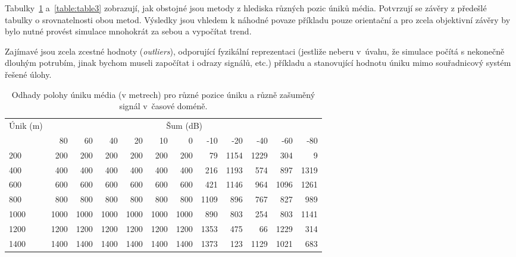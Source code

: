 Tabulky~\ref{table:table2} a~\ref{table:table3} zobrazují, jak obstojné jsou metody z hlediska různých pozic úniků média.
Potvrzují se závěry z předešlé tabulky o srovnatelnosti obou metod.
Výsledky jsou vhledem k náhodné povaze příkladu pouze orientační a pro zcela objektivní závěry by bylo nutné provést simulace mnohokrát za sebou a vypočítat trend.

Zajímavé jsou zcela zcestné hodnoty (\textit{outliers}), odporující fyzikální reprezentaci (jestliže neberu v~úvahu, že simulace počítá s nekonečně dlouhým potrubím, jinak bychom museli započítat i odrazy signálů, etc.) příkladu a stanovující hodnotu úniku mimo souřadnicový systém řešené úlohy.


\begin{table}[htb]
    \centering

    \begin{tabular}{lrrrrrrrrrrr}
        \toprule

        \multirow{2}{*}{Únik (m)}   & \multicolumn{11}{c}{Šum (dB)}                                                         \\ \cmidrule[\lightrulewidth](lr){2-12}
                                    & 80    & 60    & 40    & 20    & 10     & 0    & -10   & -20    & -40  & -60   & -80   \\ \midrule

         200                        &  200  &  200  &  200  &  200  &  200  &  200  &   79  & 1154   & 1229 &  304  &    9  \\
         400                        &  400	&  400  &  400  &  400  &  400  &  400  &  216  & 1193   &  574 &  897  & 1319  \\
         600                        &  600	&  600  &  600  &  600  &  600  &  600  &  421  & 1146   &  964 & 1096  & 1261  \\
         800                        &  800	&  800  &  800  &  800  &  800  &  800  & 1109  &  896   &  767 &  827  &  989  \\
        1000                        & 1000	& 1000  & 1000  & 1000  & 1000  & 1000  &  890  &  803   &  254 &  803  & 1141  \\
        1200                        & 1200	& 1200  & 1200  & 1200  & 1200  & 1200  & 1353  &  475   &   66 & 1229  &  314  \\
        1400                        & 1400	& 1400  & 1400  & 1400  & 1400  & 1400  & 1373  &  123   & 1129 & 1021  &  683  \\

        \bottomrule
    \end{tabular}

    \caption{Odhady polohy úniku média (v metrech) pro různé pozice úniku a různě zašuměný signál v~časové doméně.}
    \label{table:table2}
\end{table}
\FloatBarrier

